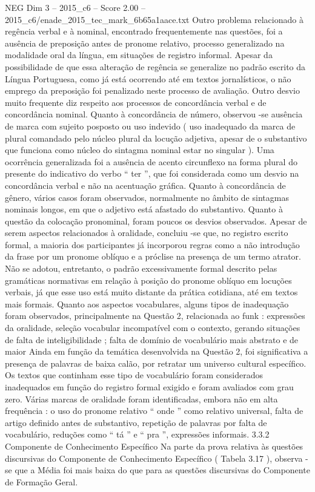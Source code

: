\begin{textsample}{NEG Dim 3 – 2015\_c6 – Score 2.00 – 2015\_c6/enade\_2015\_tec\_mark\_6b65a1aace.txt}
Outro problema relacionado à regência verbal e à nominal, encontrado frequentemente nas questões, foi a ausência de preposição antes de pronome relativo, processo generalizado na modalidade oral da língua, em situações de registro informal.
Apesar da possibilidade de que essa alteração de regência se generalize no padrão escrito da Língua Portuguesa, como já está ocorrendo até em textos jornalísticos, o não emprego da preposição foi penalizado neste processo de avaliação.
Outro desvio muito frequente diz respeito aos processos de concordância verbal e de concordância nominal.
Quanto à concordância de número, observou -se ausência de marca com sujeito posposto ou uso indevido ( uso inadequado da marca de plural comandado pelo núcleo plural da locução adjetiva, apesar de o substantivo que funciona como núcleo do sintagma nominal estar no singular ).
Uma ocorrência generalizada foi a ausência de acento circunflexo na forma plural do presente do indicativo do verbo “ ter ”, que foi considerada como um desvio na concordância verbal e não na acentuação gráfica.
Quanto à concordância de gênero, vários casos foram observados, normalmente no âmbito de sintagmas nominais longos, em que o adjetivo está afastado do substantivo.
Quanto à questão da colocação pronominal, foram poucos os desvios observados.
Apesar de serem aspectos relacionados à oralidade, concluiu -se que, no registro escrito formal, a maioria dos participantes já incorporou regras como a não introdução da frase por um pronome oblíquo e a próclise na presença de um termo atrator.
Não se adotou, entretanto, o padrão excessivamente formal descrito pelas gramáticas normativas em relação à posição do pronome oblíquo em locuções verbais, já que esse uso está muito distante da prática cotidiana, até em textos mais formais.
Quanto aos aspectos vocabulares, alguns tipos de inadequação foram observados, principalmente na Questão 2, relacionada ao funk : expressões da oralidade, seleção vocabular incompatível com o contexto, gerando situações de falta de inteligibilidade ; falta de domínio de vocabulário mais abstrato e de maior Ainda em função da temática desenvolvida na Questão 2, foi significativa a presença de palavras de baixa calão, por retratar um universo cultural específico.
Os textos que continham esse tipo de vocabulário foram considerados inadequados em função do registro formal exigido e foram avaliados com grau zero.
Várias marcas de oralidade foram identificadas, embora não em alta frequência : o uso do pronome relativo “ onde ” como relativo universal, falta de artigo definido antes de substantivo, repetição de palavras por falta de vocabulário, reduções como “ tá ” e “ pra ”, expressões informais. 3.3.2 Componente de Conhecimento Específico Na parte da prova relativa às questões discursivas do Componente de Conhecimento Específico ( Tabela 3.17 ), observa -se que a Média foi mais baixa do que para as questões discursivas do Componente de Formação Geral.

\end{textsample}
